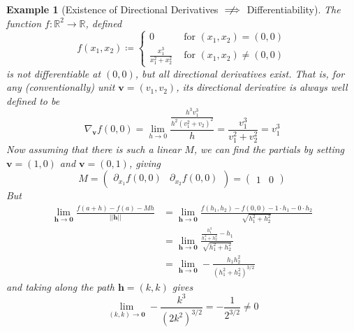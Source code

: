 \documentclass{article}
\newtheorem{example}{Example}[section]
\theoremstyle{remark}
\theoremstyle{definition}
\begin{document}
\begin{example}[Existence of Directional Derivatives $\centernot \implies$ Differentiability]
The function $f: \mathbb{R}^2 \longrightarrow \mathbb{R}$, defined 
\[f(x_1, x_2) \coloneqq \begin{cases} 
0 & \text{ for } (x_1, x_2) = (0, 0) \\
\frac{x_1^3}{x_1^2 + x_2^2} & \text{ for } (x_1, x_2) \neq (0, 0)
\end{cases}\]
is not differentiable at $(0, 0)$, but all directional derivatives exist. That is, for any (conventionally) unit $\mathbf{v} = (v_1, v_2)$, its directional derivative is always well defined to be 
\[\nabla_\mathbf{v} f(0, 0) = \lim_{h \rightarrow 0} \frac{\frac{h^3 v_1^3} {h^2 (v_1^2 + v_2)^2}}{h} = \frac{v_1^3}{v_1^2 + v_2^2} = v_1^3\]
Now assuming that there is such a linear $M$, we can find the partials by setting $\mathbf{v} = (1, 0)$ and $\mathbf{v} = (0, 1)$, giving 
\[M = \begin{pmatrix} \partial_{x_1} f(0, 0) & \partial_{x_2} f(0, 0) \end{pmatrix} = \begin{pmatrix} 1 & 0 \end{pmatrix}\]
But 
\begin{align*}
    \lim_{\mathbf{h} \rightarrow \mathbf{0}} \frac{f(a + h) - f(a) - M h}{||\mathbf{h}||} & = \lim_{\mathbf{h} \rightarrow \mathbf{0}} \frac{f(h_1, h_2) - f(0, 0) - 1 \cdot h_1 - 0 \cdot h_2}{\sqrt{h_1^2 + h_2^2}} \\
    & = \lim_{\mathbf{h} \rightarrow \mathbf{0}} \frac{\frac{h_1^3}{h_1^2 + h_2^2} - h_1}{\sqrt{h_1^2 + h_2^2}} \\
    & = \lim_{\mathbf{h} \rightarrow \mathbf{0}} - \frac{ h_1 h_2^2}{(h_1^2 + h_2^2)^{3/2}}
\end{align*}
and taking along the path $\mathbf{h} = (k, k)$ gives 
\[\lim_{(k, k) \rightarrow \mathbf{0}} - \frac{k^3}{(2k^2)^{3/2}} = - \frac{1}{2^{3/2}} \neq 0\]
\end{example}
\end{document}
